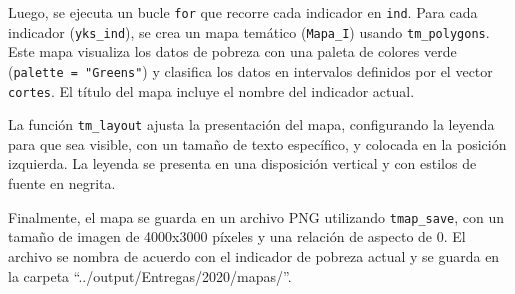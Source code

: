 \documentclass[
  12pt,
]{book}
\begin{document}
Luego, se ejecuta un bucle \texttt{for} que recorre cada indicador en \texttt{ind}. Para cada indicador (\texttt{yks\_ind}), se crea un mapa temático (\texttt{Mapa\_I}) usando \texttt{tm\_polygons}. Este mapa visualiza los datos de pobreza con una paleta de colores verde (\texttt{palette\ =\ "Greens"}) y clasifica los datos en intervalos definidos por el vector \texttt{cortes}. El título del mapa incluye el nombre del indicador actual.

La función \texttt{tm\_layout} ajusta la presentación del mapa, configurando la leyenda para que sea visible, con un tamaño de texto específico, y colocada en la posición izquierda. La leyenda se presenta en una disposición vertical y con estilos de fuente en negrita.

Finalmente, el mapa se guarda en un archivo PNG utilizando \texttt{tmap\_save}, con un tamaño de imagen de 4000x3000 píxeles y una relación de aspecto de 0. El archivo se nombra de acuerdo con el indicador de pobreza actual y se guarda en la carpeta ``../output/Entregas/2020/mapas/''.
\end{document}
